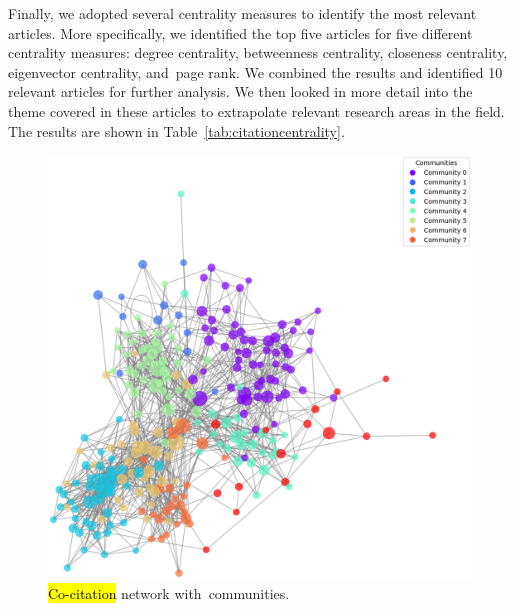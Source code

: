 \documentclass[jmse,review,accept,pdftex,moreauthors]{Definitions/mdpi}
\begin{document}
Finally, we adopted several centrality measures to identify the most relevant articles. More specifically, we identified the top five articles for five different centrality measures: degree centrality, betweenness centrality, closeness centrality, eigenvector centrality, and~page rank. We combined the results and identified 10 relevant articles for further analysis. We then looked in more detail into the theme covered in these articles to extrapolate relevant research areas in the field. The results are shown in Table~\ref{tab:citationcentrality}.

\begin{figure}[H]

	\includegraphics[width=\linewidth]{pics/cocitation_communiities.eps}
	\caption{\hl{Co-citation} %
 network with~communities.}\label{fig:fig9}
\end{figure}
\end{document}
